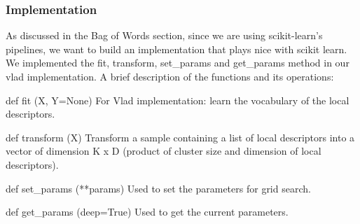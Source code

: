\documentclass[final,leqno,onefignum,onetabnum]{siamltexmm}
\begin{document}
\subsubsection{Implementation}
As discussed in the Bag of Words section, since we are using scikit-learn's pipelines, we want to build an implementation that plays nice with scikit learn.  We implemented the fit, transform, set\_params and get\_params method in our vlad implementation.  A brief description of the functions and its operations:
\begin{description}
  \item{def fit (X, Y=None)}  For Vlad implementation: learn the vocabulary of the local descriptors.
  \item{def transform (X)}  Transform a sample containing a list of local descriptors into a vector of dimension K x D (product of cluster size and dimension of local descriptors).
  \item{def set\_params (**params)} Used to set the parameters for grid search.
  \item{def get\_params (deep=True)} Used to get the current parameters.
\end{description}
\end{document}

